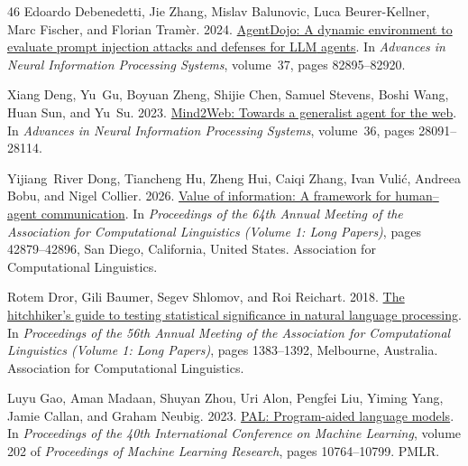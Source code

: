 \documentclass[11pt]{article}
\begin{document}
\begin{thebibliography}{46}
Edoardo Debenedetti, Jie Zhang, Mislav Balunovic, Luca Beurer-Kellner, Marc Fischer, and Florian Tram{\`e}r. 2024.
\newblock \href {https://doi.org/10.52202/079017-2636} {{AgentDojo}: A dynamic environment to evaluate prompt injection attacks and defenses for {LLM} agents}.
\newblock In \emph{Advances in Neural Information Processing Systems}, volume~37, pages 82895--82920.

Xiang Deng, Yu~Gu, Boyuan Zheng, Shijie Chen, Samuel Stevens, Boshi Wang, Huan Sun, and Yu~Su. 2023.
\newblock \href {https://doi.org/10.52202/075280-1220} {{Mind2Web}: Towards a generalist agent for the web}.
\newblock In \emph{Advances in Neural Information Processing Systems}, volume~36, pages 28091--28114.

Yijiang~River Dong, Tiancheng Hu, Zheng Hui, Caiqi Zhang, Ivan Vuli{\'c}, Andreea Bobu, and Nigel Collier. 2026.
\newblock \href {https://doi.org/10.18653/v1/2026.acl-long.1987} {Value of information: A framework for human{--}agent communication}.
\newblock In \emph{Proceedings of the 64th Annual Meeting of the {A}ssociation for {C}omputational {L}inguistics (Volume 1: Long Papers)}, pages 42879--42896, San Diego, California, United States. Association for Computational Linguistics.

Rotem Dror, Gili Baumer, Segev Shlomov, and Roi Reichart. 2018.
\newblock \href {https://doi.org/10.18653/v1/P18-1128} {The hitchhiker{'}s guide to testing statistical significance in natural language processing}.
\newblock In \emph{Proceedings of the 56th Annual Meeting of the Association for Computational Linguistics (Volume 1: Long Papers)}, pages 1383--1392, Melbourne, Australia. Association for Computational Linguistics.

Luyu Gao, Aman Madaan, Shuyan Zhou, Uri Alon, Pengfei Liu, Yiming Yang, Jamie Callan, and Graham Neubig. 2023.
\newblock \href {https://proceedings.mlr.press/v202/gao23f.html} {{PAL}: Program-aided language models}.
\newblock In \emph{Proceedings of the 40th International Conference on Machine Learning}, volume 202 of \emph{Proceedings of Machine Learning Research}, pages 10764--10799. PMLR.


\end{thebibliography}
\end{document}
